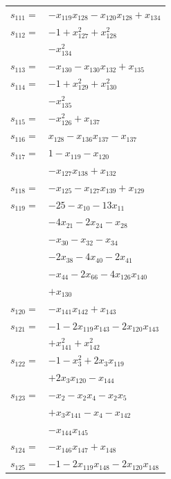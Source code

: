 \begin{longtable}{@{}r@{\;}l@{}}
\(s_{111}=\) & \(\displaystyle -x_{119}x_{128} -x_{120}x_{128} +x_{134}\) \\[3pt]
\(s_{112}=\) & \(\displaystyle -1 +x_{127}^{2} +x_{128}^{2}\) \\
 & \(\displaystyle -x_{134}^{2}\) \\[3pt]
\(s_{113}=\) & \(\displaystyle -x_{130} -x_{130}x_{132} +x_{135}\) \\[3pt]
\(s_{114}=\) & \(\displaystyle -1 +x_{129}^{2} +x_{130}^{2}\) \\
 & \(\displaystyle -x_{135}^{2}\) \\[3pt]
\(s_{115}=\) & \(\displaystyle -x_{126}^{2} +x_{137}\) \\[3pt]
\(s_{116}=\) & \(\displaystyle x_{128} -x_{136}x_{137} -x_{137}\) \\[3pt]
\(s_{117}=\) & \(\displaystyle 1 -x_{119} -x_{120}\) \\
 & \(\displaystyle -x_{127}x_{138} +x_{132}\) \\[3pt]
\(s_{118}=\) & \(\displaystyle -x_{125} -x_{127}x_{139} +x_{129}\) \\[3pt]
\(s_{119}=\) & \(\displaystyle -25 -x_{10} -13x_{11}\) \\
 & \(\displaystyle -4x_{21} -2x_{24} -x_{28}\) \\
 & \(\displaystyle -x_{30} -x_{32} -x_{34}\) \\
 & \(\displaystyle -2x_{38} -4x_{40} -2x_{41}\) \\
 & \(\displaystyle -x_{44} -2x_{66} -4x_{126}x_{140}\) \\
 & \(\displaystyle +x_{130}\) \\[3pt]
\(s_{120}=\) & \(\displaystyle -x_{141}x_{142} +x_{143}\) \\[3pt]
\(s_{121}=\) & \(\displaystyle -1 -2x_{119}x_{143} -2x_{120}x_{143}\) \\
 & \(\displaystyle +x_{141}^{2} +x_{142}^{2}\) \\[3pt]
\(s_{122}=\) & \(\displaystyle -1 -x_{3}^{2} +2x_{3}x_{119}\) \\
 & \(\displaystyle +2x_{3}x_{120} -x_{144}\) \\[3pt]
\(s_{123}=\) & \(\displaystyle -x_{2} -x_{2}x_{4} -x_{2}x_{5}\) \\
 & \(\displaystyle +x_{3}x_{141} -x_{4} -x_{142}\) \\
 & \(\displaystyle -x_{144}x_{145}\) \\[3pt]
\(s_{124}=\) & \(\displaystyle -x_{146}x_{147} +x_{148}\) \\[3pt]
\(s_{125}=\) & \(\displaystyle -1 -2x_{119}x_{148} -2x_{120}x_{148}\) \\

\end{longtable}
